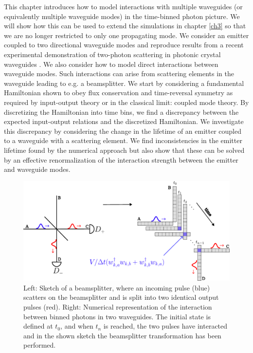 This chapter introduces how to model interactions with multiple waveguides (or equivalently multiple waveguide modes) in the time-binned photon picture. We will show how this can be used to extend the simulations in chapter \ref{ch3} so that we are no longer restricted to only one propagating mode. We consider an emitter coupled to two directional waveguide modes and reproduce results from a recent experimental demonstration of two-photon scattering in photonic crystal waveguides \cite{LeJeannic2022DynamicalEmitter}. We also consider how to model direct interactions between waveguide modes. Such interactions can arise from scattering elements in the waveguide leading to e.g. a beamsplitter. We start by considering a fundamental Hamiltonian shown to obey flux conservation and time-reversal symmetry as required by input-output theory or in the classical limit: coupled mode theory. By discretizing the Hamiltonian into time bins, we find a discrepancy between the expected input-output relations and the discretized Hamiltonian. We investigate this discrepancy by considering the change in the lifetime of an emitter coupled to a waveguide with a scattering element. We find inconsistencies in the emitter lifetime found by the numerical approach but also show that these can be solved by an effective renormalization of the interaction strength between the emitter and waveguide modes. 
\begin{figure}[H]
    \centering
    \includegraphics[width = \linewidth]{figures/waveguideinteraciton.pdf}
    \caption{Left: Sketch of a beamsplitter, where an incoming pulse (blue) scatters on the beamsplitter and is split into two identical output pulses (red). Right: Numerical representation of the interaction between binned photons in two waveguides. The initial state is defined at $t_0$, and when $t_n$ is reached, the two pulses have interacted and in the shown sketch the beamsplitter transformation has been performed. }
    \label{fig:beamsplitter_illustration}
\end{figure}



